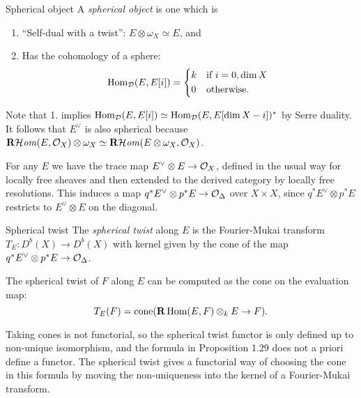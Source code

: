 \begin{definition}{Spherical object}{}
    A \emph{spherical object} is one which is
    \begin{enumerate}
        \item ``Self-dual with a twist'': $E\otimes\omega_X\simeq E$, and
        \item Has the cohomology of a sphere:
            \begin{equation*}
                \Hom_\calD(E,E[i]) = \begin{cases*}
                    k & if $i=0,\dim X$ \\
                    0 & otherwise.
                \end{cases*}
            \end{equation*}
    \end{enumerate}
\end{definition}

Note that 1. implies $\operatorname{Hom}_{\mathcal{D}}(E,E[i])\simeq\operatorname{Hom}_{\mathcal{D}}(E,E[\dim X-i])^*$ by
Serre duality. It follows that $E^\vee$ is also spherical because
$\operatorname{\mathbf{R}\mathcal{H}\mathit{om}}(E,\mathcal{O}_X)\otimes\omega_X\simeq\operatorname{\mathbf{R}\mathcal{H}\mathit{om}}(E\otimes\omega_X,\mathcal{O}_X)$.

For any $E$ we have the trace map $E^\vee\otimes E\to\mathcal{O}_X$, defined in the usual
way for locally free sheaves and then extended to the derived category by
locally free resolutions. This induces a map $q^*E^\vee\otimes p^*E\to\mathcal{O}_\Delta$
over $X\times X$, since $q^*E^\vee\otimes p^*E$ restricts to $E^\vee\otimes E$
on the diagonal.

\begin{definition}{Spherical twist}{}
    The \emph{spherical twist} along $E$ is the Fourier-Mukai transform
    $T_E:D^b(X)\to D^b(X)$ with kernel given by the cone of the map
    $q^*E^\vee\otimes p^*E\to\mathcal{O}_\Delta$.
\end{definition}

\begin{proposition}{}{}
    The spherical twist of $F$ along $E$ can be computed as the cone on the
    evaluation map:
    \begin{equation}\label{STformula}
        T_E(F)=\operatorname{cone}(\operatorname{\mathbf{R}}\operatorname{Hom}(E,F)\otimes_kE\to F).
    \end{equation}
\end{proposition}

\begin{remark}{}{}
    Taking cones is not functorial, so the spherical twist functor is only
    defined up to non-unique isomorphism, and the formula in Proposition
    1.29 does not a priori define a functor. The spherical twist gives a
    functorial way of choosing the cone in this formula by moving the
    non-uniqueness into the kernel of a Fourier-Mukai transform.
\end{remark}

